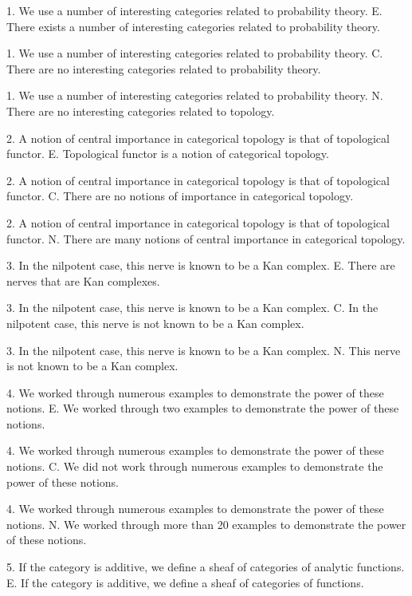 
1. We use a number of interesting categories related to probability theory.
E. There exists a number of interesting categories related to probability theory.

1. We use a number of interesting categories related to probability theory.
C. There are no interesting categories related to probability theory.

1. We use a number of interesting categories related to probability theory.
N. There are no interesting categories related to topology.

2. A notion of central importance in categorical topology is that of topological functor.
E. Topological functor is a notion of categorical topology.

2. A notion of central importance in categorical topology is that of topological functor.
C. There are no notions of importance in categorical topology.

2. A notion of central importance in categorical topology is that of topological functor.
N. There are many  notions of central importance in categorical topology.

3. In the nilpotent case, this nerve is known to be a Kan complex.
E. There are nerves that are Kan complexes.

3. In the nilpotent case, this nerve is known to be a Kan complex.
C. In the nilpotent case, this nerve is not known to be a Kan complex.

3. In the nilpotent case, this nerve is known to be a Kan complex.
N. This nerve is not known to be a Kan complex.

4. We worked through numerous examples to demonstrate the power of these notions.
E. We worked through two examples to demonstrate the power of these notions.

4. We worked through numerous examples to demonstrate the power of these notions.
C. We did not work through numerous examples to demonstrate the power of these notions.

4. We worked through numerous examples to demonstrate the power of these notions.
N. We worked through more than 20 examples to demonstrate the power of these notions.

5. If the category is additive, we define a sheaf of categories of analytic functions.
E. If the category is additive, we define a sheaf of categories of functions.

